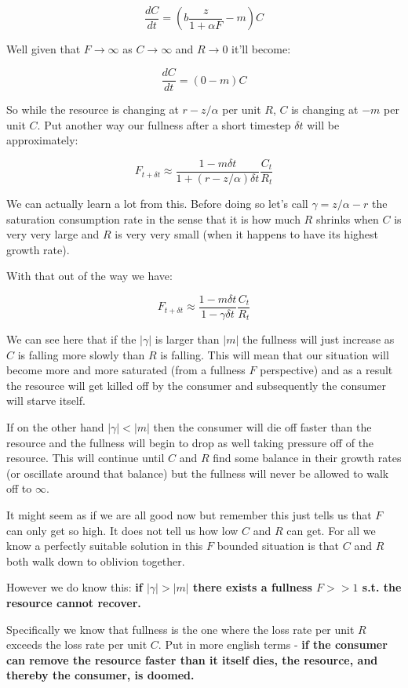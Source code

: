 \documentclass[11pt,a5paper]{book}
\begin{document}
$$\frac{dC}{dt}=\left( b\frac{z}{1+\alpha F}-m \right)C$$

Well given that $F\rightarrow \infty$ as $C \rightarrow \infty$ and $R\rightarrow 0$ it'll become:

$$\frac{dC}{dt}=\left( 0-m \right)C$$

So while the resource is changing at $r-z/\alpha$ per unit $R$, $C$ is changing at $-m$ per unit $C$. Put another way our fullness after a short timestep $\delta t$ will be approximately:

$$F_{t+\delta t} \approx \frac{1-m\delta t}{1 + (r-z/\alpha)\delta t}\frac{C_t}{R_t}$$

We can actually learn a lot from this. Before doing so let's call $\gamma=z/\alpha-r$ the saturation consumption rate in the sense that it is how much $R$ shrinks when $C$ is very very large and $R$ is very very small (when it happens to have its highest growth rate). 

With that out of the way we have:

$$F_{t+\delta t} \approx \frac{1-m\delta t}{1 - \gamma \delta t}\frac{C_t}{R_t}$$

We can see here that if the $|\gamma|$ is larger than $|m|$ the fullness will just increase as $C$ is falling more slowly than $R$ is falling. This will mean that our situation will become more and more saturated (from a fullness $F$ perspective) and as a result the resource will get killed off by the consumer and subsequently the consumer will starve itself. 

If on the other hand $|\gamma| < |m|$ then the consumer will die off faster than the resource and the fullness will begin to drop as well taking pressure off of the resource. This will continue until $C$ and $R$ find some balance in their growth rates (or oscillate around that balance) but the fullness will never be allowed to walk off to $\infty$. 

It might seem as if we are all good now but remember this just tells us that $F$ can only get so high. It does not tell us how low $C$ and $R$ can get. For all we know a perfectly suitable solution in this $F$ bounded situation is that $C$ and $R$ both walk down to oblivion together. 
\newline

However we do know this: \textbf{if $|\gamma| > |m|$ there exists a fullness $F>>1$ s.t. the resource cannot recover.}

Specifically we know that fullness is the one where the loss rate per unit $R$ exceeds the loss rate per unit $C$. Put in more english terms - \textbf{if the consumer can remove the resource faster than it itself dies, the resource, and thereby the consumer, is doomed.} 
\newline 
\end{document}
